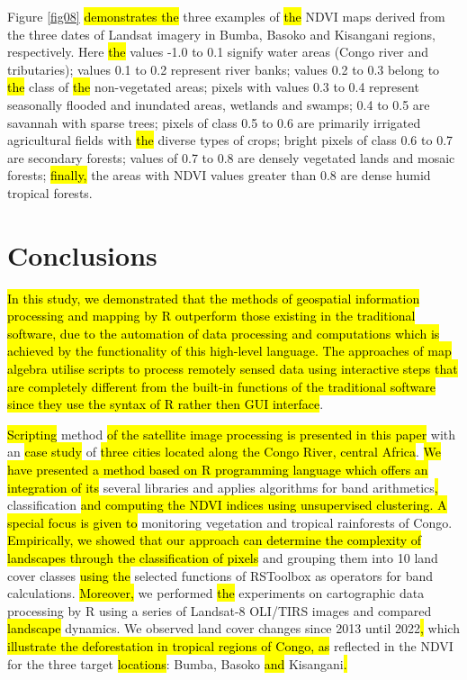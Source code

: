 \documentclass[applsci,article,submit,pdftex,moreauthors]{Definitions/mdpi}
\begin{document}
Figure \ref{fig08}\hl{ demonstrates the} three examples of \hl{the} NDVI maps derived from the three dates of Landsat imagery in Bumba, Basoko and Kisangani regions, respectively. Here \hl{the} values -1.0 to 0.1 signify water areas (Congo river and tributaries); values 0.1 to 0.2 represent river banks; values 0.2 to 0.3 belong to \hl{the} class of \hl{the} non-vegetated areas; pixels with values 0.3 to 0.4 represent seasonally flooded and inundated areas, wetlands and swamps; 0.4 to 0.5 are savannah with sparse trees; pixels of class 0.5 to 0.6 are primarily irrigated agricultural fields with \hl{the} diverse types of crops; bright pixels of class 0.6 to 0.7 are secondary forests; values of 0.7 to 0.8 are densely vegetated lands and mosaic forests; \hl{finally, }the areas with NDVI values greater than 0.8 are dense humid tropical forests. 

\section{Conclusions}
\hl{In this study, we demonstrated that the methods of geospatial information processing and mapping by R outperform those existing in the traditional software, due to the automation of data processing and computations which is achieved by the functionality of this high-level language. The approaches of map algebra utilise scripts to process remotely sensed data using interactive steps that are completely different from the built-in functions of the traditional software since they use the syntax of R rather then GUI interface}. 

\hl{Scripting} method \hl{of the satellite image processing is presented in this paper }with an \hl{case study} of \hl{three cities located along the Congo River, central Africa}. \hl{We have presented a method based on R programming language which offers an integration of its} several libraries and applies\hl{ }algorithms for band arithmetics\hl{, }classification\hl{ and computing the NDVI indices using unsupervised clustering. A special focus is given to} monitoring vegetation and tropical rainforests of Congo. \hl{Empirically, we showed that our approach can determine the complexity of landscapes through the classification of pixels} and grouping them into 10 land cover classes \hl{using the} selected functions of RSToolbox\hl{ }as operators for band calculations. \hl{Moreover, }we performed \hl{the} experiments on cartographic data processing by R using a series of Landsat-8 OLI/TIRS images and compared \hl{landscape} dynamics. We observed\hl{ }land cover changes since 2013 until 2022\hl{, }which \hl{illustrate the deforestation in tropical regions of Congo, as} reflected in the NDVI\hl{ }for the three target \hl{locations}: Bumba, Basoko \hl{and} Kisangani\hl{.}
\end{document}

